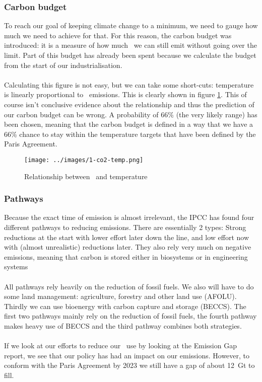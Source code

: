 \documentclass[../summary.tex]{subfiles}
\begin{document}
\subsubsection{Carbon budget}
To reach our goal of keeping climate change to a minimum, we need to gauge how much we need to achieve for that. For this reason, the carbon budget was introduced: it is a measure of how much \COtwo\ we can still emit without going over the limit. Part of this budget has already been spent because we calculate the budget from the start of our industrialisation.
\\\\
Calculating this figure is not easy, but we can take some short-cuts: temperature is linearly proportional to \COtwo\ emissions. This is clearly shown in figure \ref{fig:co2-temp}. This of course isn't conclusive evidence about the relationship and thus the prediction of our carbon budget can be wrong. A probability of 66\% (the very likely range) has been chosen, meaning that the carbon budget is defined in a way that we have a 66\% chance to stay within the temperature targets that have been defined by the Paris Agreement.
\begin{figure}[h]
	\centering
	\texttt{[image: ../images/1-co2-temp.png]}
	\caption{Relationship between \COtwo\ and temperature}
	\label{fig:co2-temp}
\end{figure}

\subsubsection{Pathways}
Because the exact time of emission is almost irrelevant, the IPCC has found four different pathways to reducing emissions. There are essentially 2 types: Strong reductions at the start with lower effort later down the line, and low effort now with (almost unrealistic) reductions later. They also rely very much on negative emissions, meaning that carbon is stored either in biosystems or in engineering systems
\\\\
All pathways rely heavily on the reduction of fossil fuels. We also will have to do some land management: agriculture, forestry and other land use (AFOLU). Thirdly we can use bioenergy with carbon capture and storage (BECCS). The first two pathways mainly rely on the reduction of fossil fuels, the fourth pathway makes heavy use of BECCS and the third pathway combines both strategies.
\\\\
If we look at our efforts to reduce our \COtwo\ use by looking at the Emission Gap report, we see that our policy has had an impact on our emissions. However, to conform with the Paris Agreement by 2023 we still have a gap of about \SI{12}{\giga\tonne} to fill. %
\end{document}
